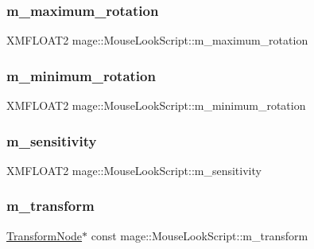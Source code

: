 \subsubsection{\texorpdfstring{m\+\_\+maximum\+\_\+rotation}{m\_maximum\_rotation}}
{\footnotesize\ttfamily X\+M\+F\+L\+O\+A\+T2 mage\+::\+Mouse\+Look\+Script\+::m\+\_\+maximum\+\_\+rotation\hspace{0.3cm}{\ttfamily [private]}}

\hypertarget{classmage_1_1_mouse_look_script_ad09bda241666f60dfc408500cafd073d}{}\label{classmage_1_1_mouse_look_script_ad09bda241666f60dfc408500cafd073d} 
\subsubsection{\texorpdfstring{m\+\_\+minimum\+\_\+rotation}{m\_minimum\_rotation}}
{\footnotesize\ttfamily X\+M\+F\+L\+O\+A\+T2 mage\+::\+Mouse\+Look\+Script\+::m\+\_\+minimum\+\_\+rotation\hspace{0.3cm}{\ttfamily [private]}}

\hypertarget{classmage_1_1_mouse_look_script_a4f38b9bd8e7271503a70753ce6a923c7}{}\label{classmage_1_1_mouse_look_script_a4f38b9bd8e7271503a70753ce6a923c7} 
\subsubsection{\texorpdfstring{m\+\_\+sensitivity}{m\_sensitivity}}
{\footnotesize\ttfamily X\+M\+F\+L\+O\+A\+T2 mage\+::\+Mouse\+Look\+Script\+::m\+\_\+sensitivity\hspace{0.3cm}{\ttfamily [private]}}

\hypertarget{classmage_1_1_mouse_look_script_a419b30350dc3eed30ae2f983812391f5}{}\label{classmage_1_1_mouse_look_script_a419b30350dc3eed30ae2f983812391f5} 
\subsubsection{\texorpdfstring{m\+\_\+transform}{m\_transform}}
{\footnotesize\ttfamily \hyperlink{structmage_1_1_transform_node}{Transform\+Node}$\ast$ const mage\+::\+Mouse\+Look\+Script\+::m\+\_\+transform\hspace{0.3cm}{\ttfamily [private]}}

